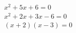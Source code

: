 \[ \begin{array} { l } x ^ { 2 } + 5 x + 6 = 0 \\ x ^ { 2 } + 2 x + 3 x - 6 = 0 \\ ( x + 2 ) ( x - 3 ) = 0 \end{array} \]